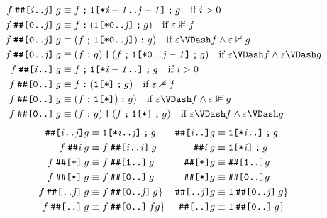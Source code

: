\documentclass[a4paper,twoside,10pt,DIV=12]{scrreprt}
\newcommand{\OR}{\mathbin{\texttt{|}}}
\newcommand{\FUSION}{\mathbin{\texttt{:}}}
\newcommand{\CONCAT}{\mathbin{\texttt{;}}}
\newcommand{\DELAY}[1]{\mathbin{\texttt{\#\##1}}}
\newcommand{\DELAYR}[1]{\mathbin{\texttt{\#\#[#1]}}}
\newcommand{\DELAYP}[1]{\mathbin{\texttt{\#\#[+]}}}
\newcommand{\DELAYS}[1]{\mathbin{\texttt{\#\#[*]}}}
\newcommand{\0}{\texttt{0}}
\newcommand{\1}{\texttt{1}}
\newcommand{\STAR}[1]{\texttt{[*#1]}}
\newcommand\mvar[1]{\ensuremath{\mathit{#1}}}
\begin{document}
\begin{align*}
  f\DELAYR{\mvar{i}..\mvar{j}}g & \equiv f\CONCAT{}\1\STAR{\mvar{i-1}..\mvar{j-1}}\CONCAT{}g\quad\text{if~}i>0                                                    \\
  f\DELAYR{0..\mvar{j}}g        & \equiv f\FUSION(\1\STAR{0..\mvar{j}}\CONCAT{}g)\quad\text{if~}\varepsilon\nVDash f                                              \\
  f\DELAYR{0..\mvar{j}}g        & \equiv (f\CONCAT{}\1\STAR{0..\mvar{j}})\FUSION{}g)\quad\text{if~}\varepsilon\VDash f \land \varepsilon\nVDash g                 \\
  f\DELAYR{0..\mvar{j}}g        & \equiv (f\FUSION{}g)\OR(f\CONCAT{}\1\STAR{0..\mvar{j-1}}\CONCAT{}g)\quad\text{if~}\varepsilon\VDash f \land \varepsilon\VDash g \\
  f\DELAYR{\mvar{i}..}g         & \equiv f\CONCAT{}\1\STAR{\mvar{i-1}..}\CONCAT{}g\quad\text{if~}i>0                                                              \\
  f\DELAYR{0..}g                & \equiv f\FUSION(\1\STAR{}\CONCAT{}g)\quad\text{if~}\varepsilon\nVDash f                                                         \\
  f\DELAYR{0..}g                & \equiv (f\CONCAT{}\1\STAR{})\FUSION{}g)\quad\text{if~}\varepsilon\VDash f \land \varepsilon\nVDash g                            \\
  f\DELAYR{0..}g                & \equiv (f\FUSION{}g)\OR(f\CONCAT{}\1\STAR{}\CONCAT{}g)\quad\text{if~}\varepsilon\VDash f \land \varepsilon\VDash g
\end{align*}
\begin{align*}
  \DELAYR{\mvar{i}..\mvar{j}}g  & \equiv \1\STAR{\mvar{i}..\mvar{j}}\CONCAT g & \DELAYR{\mvar{i}..}g  & \equiv \1\STAR{\mvar{i}..}\CONCAT g                       \\
  f\DELAY{\mvar{i}} g           & \equiv f\DELAYR{\mvar{i}..\mvar{i}} g       & {}\DELAY{\mvar{i}} g  & \equiv \1\STAR{\mvar{i}}\CONCAT g                         \\
  f\DELAYP{}g                   & \equiv f\DELAYR{1..}g                       & \DELAYP{} g           & \equiv\DELAYR{1..}g                                       \\
  f\DELAYS{}g                   & \equiv f\DELAYR{0..}g                       & \DELAYS{} g           & \equiv\DELAYR{0..}g                                       \\
  f\DELAYR{..\mvar{j}} g        & \equiv f\DELAYR{0..\mvar{j}} g\}            & \DELAYR{..\mvar{j}} g & \equiv \1\DELAYR{0..\mvar{j}} g\}                         \\
  f\DELAYR{..} g                & \equiv f\DELAYR{0..} f g\}                  & \DELAYR{..} g         & \equiv \1\DELAYR{0..} g\}
\end{align*}
\end{document}
